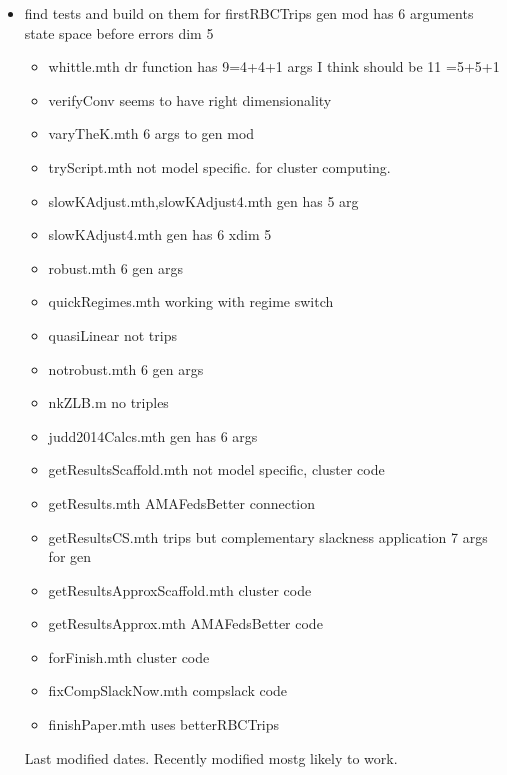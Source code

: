 \documentclass[hyperref,idxtotoc]{labbook}
\begin{document}
\begin{itemize}
\item find tests and build on them for firstRBCTrips  gen mod has 6 arguments state space  before errors dim 5
  \begin{itemize}
  \item whittle.mth dr function has 9=4+4+1 args  I think should be 11 =5+5+1
  \item verifyConv seems to have right dimensionality 
  \item varyTheK.mth 6 args to gen mod
  \item tryScript.mth not model specific. for cluster computing.
  \item slowKAdjust.mth,slowKAdjust4.mth gen has 5 arg 
  \item slowKAdjust4.mth gen has 6 xdim 5
  \item robust.mth  6 gen args 
  \item quickRegimes.mth working with regime switch
  \item quasiLinear not trips
  \item notrobust.mth  6 gen args 
  \item nkZLB.m no triples
  \item judd2014Calcs.mth  gen has 6 args
  \item getResultsScaffold.mth not model specific, cluster code
  \item getResults.mth AMAFedsBetter connection
  \item getResultsCS.mth  trips but complementary slackness application  7 args for gen
  \item getResultsApproxScaffold.mth cluster code
  \item getResultsApprox.mth AMAFedsBetter code
  \item forFinish.mth  cluster code
  \item fixCompSlackNow.mth  compslack code
  \item finishPaper.mth uses betterRBCTrips
  \end{itemize}
Last modified dates.  Recently modified mostg likely to work.


\end{itemize}
\end{document}
